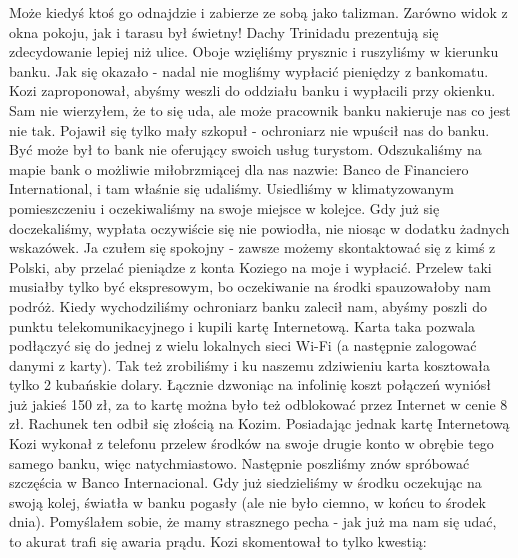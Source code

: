 Może kiedyś ktoś go odnajdzie i zabierze ze sobą jako talizman.
Zarówno widok z okna pokoju, jak i tarasu był świetny!
Dachy Trinidadu prezentują się zdecydowanie lepiej niż ulice.
Oboje wzięliśmy prysznic i ruszyliśmy w kierunku banku.
Jak się okazało - nadal nie mogliśmy wypłacić pieniędzy z bankomatu.
Kozi zaproponował, abyśmy weszli do oddziału banku i wypłacili przy okienku.
Sam nie wierzyłem, że to się uda, ale może pracownik banku nakieruje nas co jest nie tak.
Pojawił się tylko mały szkopuł - ochroniarz nie wpuścił nas do banku.
Być może był to bank nie oferujący swoich usług turystom.
Odszukaliśmy na mapie bank o możliwie miłobrzmiącej dla nas nazwie: Banco de Financiero International, i tam właśnie się udaliśmy.
Usiedliśmy w klimatyzowanym pomieszczeniu i oczekiwaliśmy na swoje miejsce w kolejce.
Gdy już się doczekaliśmy, wypłata oczywiście się nie powiodła, nie niosąc w dodatku żadnych wskazówek.
Ja czułem się spokojny - zawsze możemy skontaktować się z kimś z Polski, aby przelać pieniądze z konta Koziego na moje i wypłacić.
Przelew taki musiałby tylko być ekspresowym, bo oczekiwanie na środki spauzowałoby nam podróż.
Kiedy wychodziliśmy ochroniarz banku zalecił nam, abyśmy poszli do punktu telekomunikacyjnego i kupili kartę Internetową.
Karta taka pozwala podłączyć się do jednej z wielu lokalnych sieci Wi-Fi (a następnie zalogować danymi z karty).
Tak też zrobiliśmy i ku naszemu zdziwieniu karta kosztowała tylko 2 kubańskie dolary.
Łącznie dzwoniąc na infolinię koszt połączeń wyniósł już jakieś 150 zł, za to kartę można było też odblokować przez Internet w cenie 8 zł.
Rachunek ten odbił się złością na Kozim.
Posiadając jednak kartę Internetową Kozi wykonał z telefonu przelew środków na swoje drugie konto w obrębie tego samego banku, więc natychmiastowo.
Następnie poszliśmy znów spróbować szczęścia w Banco Internacional.
Gdy już siedzieliśmy w środku oczekując na swoją kolej, światła w banku pogasły (ale nie było ciemno, w końcu to środek dnia).
Pomyślałem sobie, że mamy strasznego pecha - jak już ma nam się udać, to akurat trafi się awaria prądu.
Kozi skomentował to tylko kwestią:


